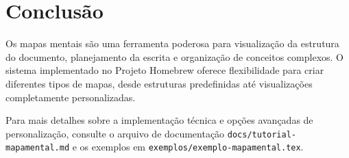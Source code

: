 \begin{docstructmap}
    
    
    
    
    
    
\end{docstructmap}


\section{Conclusão}

Os mapas mentais são uma ferramenta poderosa para visualização da estrutura do documento, planejamento da escrita e organização de conceitos complexos. O sistema implementado no Projeto Homebrew oferece flexibilidade para criar diferentes tipos de mapas, desde estruturas predefinidas até visualizações completamente personalizadas.

\begin{highlight}
Para mais detalhes sobre a implementação técnica e opções avançadas de personalização, consulte o arquivo de documentação \texttt{docs/tutorial-mapamental.md} e os exemplos em \texttt{exemplos/exemplo-mapamental.tex}.
\end{highlight}